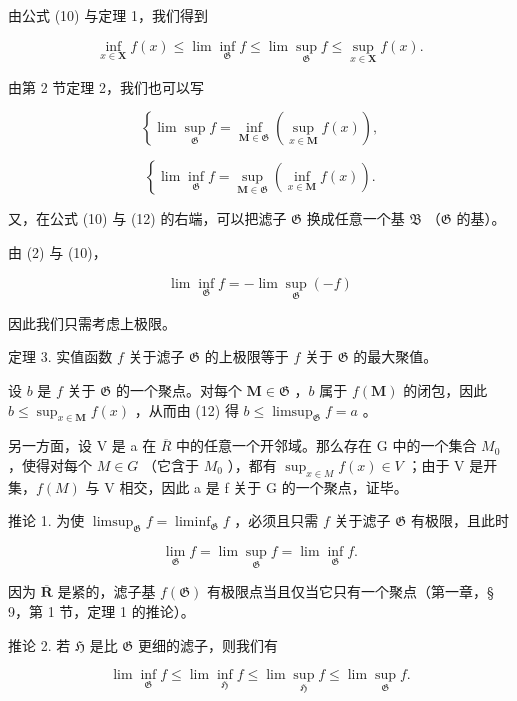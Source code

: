 由公式 (10) 与定理 1，我们得到

\[
\inf _ {x \in \mathbf {X}} f (x) \leqslant \lim \inf _ {\mathfrak {G}} f \leqslant \lim \sup _ {\mathfrak {G}} f \leqslant \sup _ {x \in \mathbf {X}} f (x).\tag{11}
\]

由第 2 节定理 2，我们也可以写

\[
\left\{\lim \sup _ {\mathfrak {G}} f = \inf _ {\mathbf {M} \in \mathfrak {G}} (\sup _ {x \in \mathbf {M}} f (x)), \right.\tag{12}
\]

\[
\left\{\lim \inf _ {\mathfrak {G}} f = \sup _ {\mathbf {M} \in \mathfrak {G}} (\inf _ {x \in \mathbf {M}} f (x)). \right.
\]

又，在公式 (10) 与 (12) 的右端，可以把滤子 \(\mathfrak{G}\) 换成任意一个基 \(\mathfrak{B}\) （\(\mathfrak{G}\) 的基）。

由 (2) 与 (10)，

\[
\lim \inf _ {\mathfrak {G}} f = - \lim \sup _ {\mathfrak {G}} (- f)\tag{13}
\]

因此我们只需考虑上极限。

定理 3. 实值函数 \(f\) 关于滤子 \(\mathfrak{G}\) 的上极限等于 \(f\) 关于 \(\mathfrak{G}\) 的最大聚值。

设 \(b\) 是 \(f\) 关于 \(\mathfrak{G}\) 的一个聚点。对每个 \(\mathbf{M} \in \mathfrak{G}\) ，\(b\) 属于 \(f(\mathbf{M})\) 的闭包，因此 \(b \leqslant \sup_{x \in \mathbf{M}} f(x)\) ，从而由 (12) 得 \(b \leqslant \limsup_{\mathfrak{G}} f = a\) 。

另一方面，设 V 是 a 在 \(\overline{R}\) 中的任意一个开邻域。那么存在 G 中的一个集合 \(M_{0}\) ，使得对每个 \(M \in G\) （它含于 \(M_{0}\) ），都有 \(\sup_{x \in M} f(x) \in V\) ；由于 V 是开集，\(f(M)\) 与 V 相交，因此 a 是 f 关于 G 的一个聚点，证毕。

推论 1. 为使 \(\limsup_{\mathfrak{G}}f = \liminf_{\mathfrak{G}}f\) ，必须且只需 \(f\) 关于滤子 \(\mathfrak{G}\) 有极限，且此时

\[
\lim _ {\mathfrak {G}} f = \lim \sup _ {\mathfrak {G}} f = \lim \inf _ {\mathfrak {G}} f.
\]

因为 \(\overline{\mathbf{R}}\) 是紧的，滤子基 \(f(\mathfrak{G})\) 有极限点当且仅当它只有一个聚点（第一章，§ 9，第 1 节，定理 1 的推论）。

推论 2. 若 \(\mathfrak{H}\) 是比 \(\mathfrak{G}\) 更细的滤子，则我们有

\[
\lim \inf _ {\mathfrak {G}} f \leqslant \lim \inf _ {\mathfrak {H}} f \leqslant \lim \sup _ {\mathfrak {H}} f \leqslant \lim \sup _ {\mathfrak {G}} f.
\]

